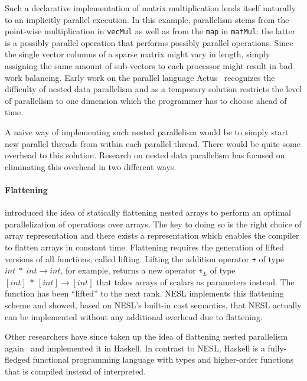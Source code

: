 \documentclass[a4paper]{article}
\begin{document}
Such a declarative implementation of matrix multiplication lends itself naturally to an implicitly parallel execution. In this example, parallelism stems from the point-wise multiplication in \texttt{vecMul} as well as from the \texttt{map} in \texttt{matMul}: the latter is a possibly parallel operation that performs possibly parallel operations. Since the single vector columns of a sparse matrix might vary in length, simply assigning the same amount of sub-vectors to each processor might result in bad work balancing. Early work on the parallel language Actus~\cite{Perrott:1979:LAV:357073.357075} recognizes the difficulty of nested data parallelism and as a temporary solution restricts the level of parallelism to one dimension which the programmer has to choose ahead of time.

A naive way of implementing such nested parallelism would be to simply start new parallel threads from within each parallel thread. There would be quite some overhead to this solution. Research on nested data parallelism has focused on eliminating this overhead in two different ways.

\paragraph{Flattening}

\citet{Blelloch1993Implementation} introduced the idea of statically flattening nested arrays to perform an optimal parallelization of operations over arrays. The key to doing so is the right choice of array representation and there exists a representation which enables the compiler to flatten arrays in constant time. Flattening requires the generation of lifted versions of all functions, called lifting. Lifting the addition operator \texttt{+} of type $int ~ * ~ int \rightarrow int$, for example, returns a new operator \texttt{+}$_L$ of type $[int] ~ * ~ [int] \rightarrow [int]$ that takes arrays of scalars as parameters instead. The function has been ``lifted'' to the next rank. NESL implements this flattening scheme and \citet{Blelloch:1996:PTS:232627.232650} showed, based on NESL's built-in cost semantics, that NESL actually can be implemented without any additional overhead due to flattening.

Other researchers have since taken up the idea of flattening nested parallelism again~\cite{Lippmeier:2012:WEH:2364527.2364564} and implemented it in Haskell. In contrast to NESL, Haskell is a fully-fledged functional programming language with types and higher-order functions that is compiled instead of interpreted.
\end{document}

